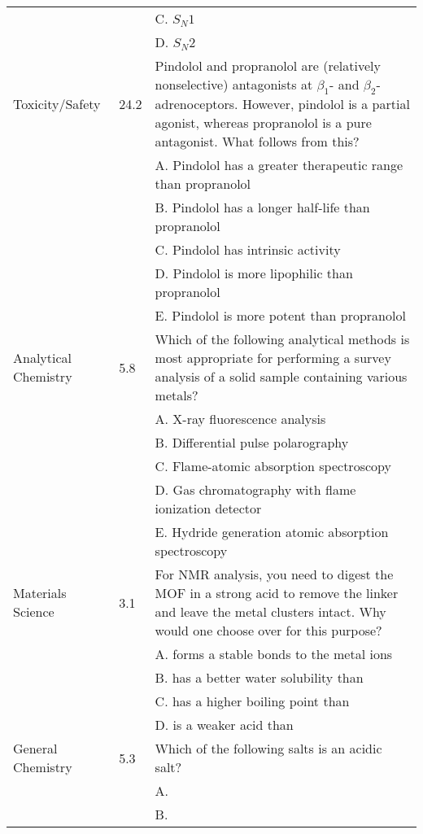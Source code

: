 \begin{xltabular}{\textwidth}{p{2.7cm}p{4em}X}
        & & C. $S_N1$ \\
        & & D. $S_N2$ \\
        \midrule
        Toxicity/Safety & 24.2 & Pindolol and propranolol are (relatively nonselective) antagonists at $\beta_1$- and $\beta_2$-adrenoceptors. However, pindolol is a partial agonist, whereas propranolol is a pure antagonist. What follows from this? \\
        & & A. Pindolol has a greater therapeutic range than propranolol \\
        & & B. Pindolol has a longer half-life than propranolol \\
        & & C. Pindolol has intrinsic activity \\
        & & D. Pindolol is more lipophilic than propranolol \\
        & & E. Pindolol is more potent than propranolol \\
        \midrule
        Analytical Chemistry & 5.8 & Which of the following analytical methods is most appropriate for performing a survey analysis of a solid sample containing various metals? \\
        & & A. X-ray fluorescence analysis \\
        & & B. Differential pulse polarography \\
        & & C. Flame-atomic absorption spectroscopy \\
        & & D. Gas chromatography with flame ionization detector \\
        & & E. Hydride generation atomic absorption spectroscopy \\
        \midrule
        Materials Science & 3.1 & For NMR analysis, you need to digest the MOF in a strong acid to remove the linker and leave the metal clusters intact. Why would one choose  over  for this purpose? \\
        & & A.  forms a stable bonds to the metal ions \\
        & & B.  has a better water solubility than  \\
        & & C.  has a higher boiling point than  \\
        & & D.  is a weaker acid than  \\
        \midrule
        General Chemistry & 5.3 & Which of the following salts is an acidic salt? \\
        & & A.  \\
        & & B.  \\

\end{xltabular}

